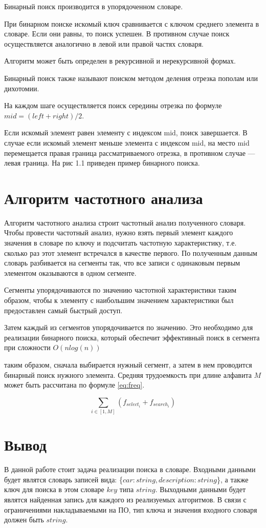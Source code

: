 Бинарный поиск\cite{binary} производится в упорядоченном словаре.

При бинарном поиске искомый ключ сравнивается с ключом среднего элемента в словаре. Если они равны, то поиск успешен. В противном случае поиск осуществляется аналогично в левой или правой частях словаря.

Алгоритм может быть определен в рекурсивной и нерекурсивной формах.

Бинарный поиск также называют поиском методом деления отрезка пополам или дихотомии.

На каждом шаге осуществляется поиск середины отрезка по формуле $mid = (left + right) / 2$.

Если искомый элемент равен элементу с индексом mid, поиск завершается.
В случае если искомый элемент меньше элемента с индексом mid, на место mid перемещается правая граница рассматриваемого отрезка, в противном случае — левая граница.
На рис 1.1 приведен пример бинарного поиска.



\section{Алгоритм частотного анализа}

Алгоритм частотного анализа строит частотный анализ полученного словаря. Чтобы провести частотный анализ, нужно взять первый элемент каждого значения в словаре по ключу и подсчитать частотную характеристику, т.е. сколько раз этот элемент встречался в качестве первого. По полученным данным словарь разбивается на сегменты так, что все записи с одинаковым первым элементом оказываются в одном сегменте.

Сегменты упорядочиваются по значению частотной характеристики таким образом, чтобы к элементу с наибольшим значением характеристики был предоставлен самый быстрый доступ.

Затем каждый из сегментов упорядочивается по значению. Это необходимо для реализации бинарного поиска, который обеспечит эффективный поиск в сегмента при сложности $O(nlog(n))$

таким образом, сначала выбирается нужный сегмент, а затем в нем проводится бинарный поиск  нужного элемента. Средняя трудоемкость при длине алфавита $M$ может быть рассчитана по формуле \eqref{eq:freq}.

\begin{equation}
   \sum_{i \in [1, M]} (f_{select_i} + f_{search_i})
   \label{eq:freq}
\end{equation}



\section*{Вывод} 
В данной работе стоит задача реализации поиска в словаре. Входными данными будет являтся словарь записей вида: \{$car:string, description:string$\}, а также ключ для поиска в этом словаре $key$ типа $string$. Выходными данными будет являтся найденная запись для каждого из реализуемых алгоритмов. В связи с ограничениями накладываемыми на ПО, тип ключа и значения входного словаря должен быть $string$.
